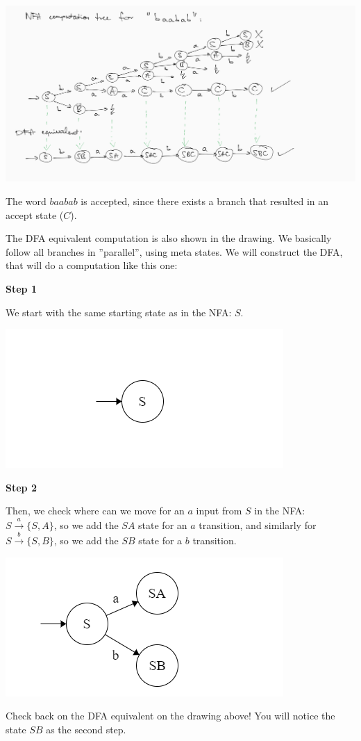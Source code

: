 \includegraphics[width=\linewidth]{02/comp_tree_1_nfa_dfa.png}

The word $baabab$ is accepted, since there exists a branch that resulted in an accept state ($C$).

The DFA equivalent computation is also shown in the drawing. We basically follow all branches in ''parallel'', using meta states. We will construct the DFA, that will do a computation like this one:

\textbf{Step 1}

We start with the same starting state as in the NFA: $S$.

\includegraphics[width=0.5\linewidth]{02/dfa_step_01.png}

\textbf{Step 2}

Then, we check where can we move for an $a$ input from $S$ in the NFA: $S\xrightarrow{a}\{S,A\}$, so we add the $SA$ state for an $a$ transition, and similarly for $S\xrightarrow{b}\{S,B\}$, so we add the $SB$ state for a $b$ transition.

\includegraphics[width=0.5\linewidth]{02/dfa_step_02.png}

Check back on the DFA equivalent on the drawing above! You will notice the state $SB$ as the second step.

